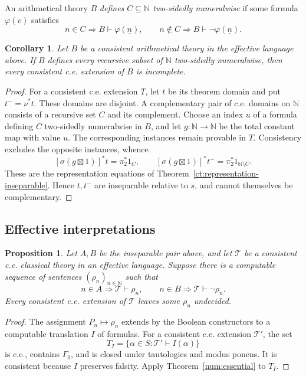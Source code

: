 \documentclass[11pt]{article}
\newtheorem{proposition}[theorem]{Proposition}
\newtheorem{corollary}[theorem]{Corollary}
\theoremstyle{definition}
\theoremstyle{remark}
\newcommand{\N}{\mathbb N}
\begin{document}
An arithmetical theory $B$ \emph{defines $C\subseteq\N$ two-sidedly
numeralwise} if some formula $\varphi(v)$ satisfies
\[
 n\in C\Longrightarrow B\vdash\varphi(\underline n),\qquad
 n\notin C\Longrightarrow B\vdash\neg\varphi(\underline n).
\]

\begin{corollary}\label{num:recursive-representation}
Let $B$ be a consistent arithmetical theory in the effective language
above. If $B$ defines every recursive subset of $\N$ two-sidedly
numeralwise, then every consistent c.e. extension of $B$ is incomplete.
\end{corollary}
\begin{proof}
For a consistent c.e. extension $T$, let $t$ be its theorem domain and
put $t^-=\nu^*t$. These domains are disjoint. A complementary pair of
c.e. domains on $\N$ consists of a recursive set $C$ and its complement.
Choose an index $u$ of a formula defining $C$ two-sidedly numeralwise
in $B$, and let $g:\N\to\N$ be the total constant map with value $u$.
The corresponding instances remain provable in $T$. Consistency excludes
the opposite instances, whence
\[
 [\sigma(g\boxtimes1)]^*t=\pi_2^*1_C,
 \qquad
 [\sigma(g\boxtimes1)]^*t^-=\pi_2^*1_{\N\setminus C}.
\]
These are the representation equations of
Theorem~\ref{ct:representation-inseparable}. Hence $t,t^-$ are
inseparable relative to $s$, and cannot themselves be complementary.
\end{proof}

\subsection{Effective interpretations}

\begin{proposition}\label{num:interpretation}
Let $A,B$ be the inseparable pair above, and let $\mathcal T$ be a
consistent c.e. classical theory in an effective language. Suppose there
is a computable sequence of sentences $(\rho_n)_{n\in\N}$ such that
\[
 n\in A\Longrightarrow\mathcal T\vdash\rho_n,\qquad
 n\in B\Longrightarrow\mathcal T\vdash\neg\rho_n.
\]
Every consistent c.e. extension of $\mathcal T$ leaves some $\rho_n$
undecided.
\end{proposition}
\begin{proof}
The assignment $P_n\mapsto\rho_n$ extends by the Boolean constructors
to a computable translation $I$ of formulas. For a consistent c.e.
extension $\mathcal T'$, the set
\[
 T_I=\{\alpha\in S:\mathcal T'\vdash I(\alpha)\}
\]
is c.e., contains $\Gamma_0$, and is closed under tautologies and modus
ponens. It is consistent because $I$ preserves falsity. Apply
Theorem~\ref{num:essential} to $T_I$.
\end{proof}
\end{document}

